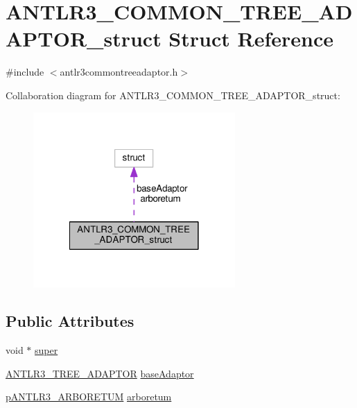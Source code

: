 \hypertarget{struct_a_n_t_l_r3___c_o_m_m_o_n___t_r_e_e___a_d_a_p_t_o_r__struct}{\section{A\-N\-T\-L\-R3\-\_\-\-C\-O\-M\-M\-O\-N\-\_\-\-T\-R\-E\-E\-\_\-\-A\-D\-A\-P\-T\-O\-R\-\_\-struct Struct Reference}
\label{struct_a_n_t_l_r3___c_o_m_m_o_n___t_r_e_e___a_d_a_p_t_o_r__struct}
}


{\ttfamily \#include $<$antlr3commontreeadaptor.\-h$>$}



Collaboration diagram for A\-N\-T\-L\-R3\-\_\-\-C\-O\-M\-M\-O\-N\-\_\-\-T\-R\-E\-E\-\_\-\-A\-D\-A\-P\-T\-O\-R\-\_\-struct\-:
\nopagebreak
\begin{figure}[H]
\begin{center}
\leavevmode
\includegraphics[width=218pt]{struct_a_n_t_l_r3___c_o_m_m_o_n___t_r_e_e___a_d_a_p_t_o_r__struct__coll__graph}
\end{center}
\end{figure}
\subsection*{Public Attributes}
\begin{DoxyCompactItemize}
\item 
void $\ast$ \hyperlink{struct_a_n_t_l_r3___c_o_m_m_o_n___t_r_e_e___a_d_a_p_t_o_r__struct_a66f724be506c6bb92d5feb3cfd207635}{super}
\item 
\hyperlink{antlr3basetreeadaptor_8h_a4590cab213ce00e95b4e1a8545d353d8}{A\-N\-T\-L\-R3\-\_\-\-T\-R\-E\-E\-\_\-\-A\-D\-A\-P\-T\-O\-R} \hyperlink{struct_a_n_t_l_r3___c_o_m_m_o_n___t_r_e_e___a_d_a_p_t_o_r__struct_ab7b3f2c6b6fc9cf9085e5f8ec4dab465}{base\-Adaptor}
\item 
\hyperlink{antlr3interfaces_8h_a400ca2545f5a9f036bfb533b9d345128}{p\-A\-N\-T\-L\-R3\-\_\-\-A\-R\-B\-O\-R\-E\-T\-U\-M} \hyperlink{struct_a_n_t_l_r3___c_o_m_m_o_n___t_r_e_e___a_d_a_p_t_o_r__struct_ac28fb32f402da751776131d34e83b8a2}{arboretum}
\end{DoxyCompactItemize}


